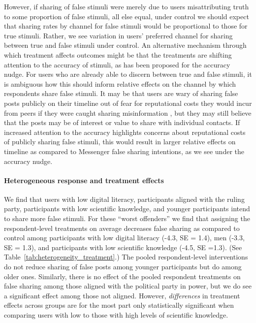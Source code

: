 \documentclass[letterpaper, 12pt, parskip=full,DIV=10]{scrartcl}
\begin{document}
However, if sharing of false stimuli were merely due to users misattributing truth to some proportion of false stimuli, all else equal, under control we should expect that sharing rates by channel for false stimuli would be proportional to those for true stimuli. Rather, we see variation in users' preferred channel for sharing between true and false stimuli under control. An alternative mechanism through which treatment affects outcomes might be that the treatments are shifting attention to the accuracy of stimuli, as has been proposed for the accuracy nudge. For users who are already able to discern between true and false stimuli, it is ambiguous how this should inform relative effects on the channel by which respondents share false stimuli. It may be that users are wary of sharing false posts publicly on their timeline out of fear for reputational costs they would incur from peers if they were caught sharing misinformation \citep{altay2022so}, but they may still believe that the posts may be of interest or value to share with individual contacts. If increased attention to the accuracy highlights concerns about reputational costs of publicly sharing false stimuli, this would result in larger relative effects on timeline as compared to Messenger false sharing intentions, as we see under the accuracy nudge.  %


\paragraph{Heterogeneous response and treatment effects}

We find that users with low digital literacy, participants aligned with the ruling party,  participants with low scientific knowledge, and younger participants intend to share more false stimuli. For these ``worst offenders'' we find that assigning the respondent-level treatments on average decreases false sharing as compared to control among participants with low digital literacy (-4.3, SE = 1.4), men (-3.3, SE = 1.3), and participants with low scientific knowledge (-4.5, SE =1.3). (See Table~\ref{tab:heterogeneity_treatment}.) The pooled respondent-level interventions do not reduce sharing of false posts among younger participants but do among older ones. Similarly, there is no effect of the pooled respondent treatments on false sharing among those aligned with the political party in power, but we do see a significant effect among those not aligned. However, \textit{differences} in treatment effects across groups are for the most part only statistically significant when comparing users with low to those with high levels of scientific knowledge.
\end{document}
